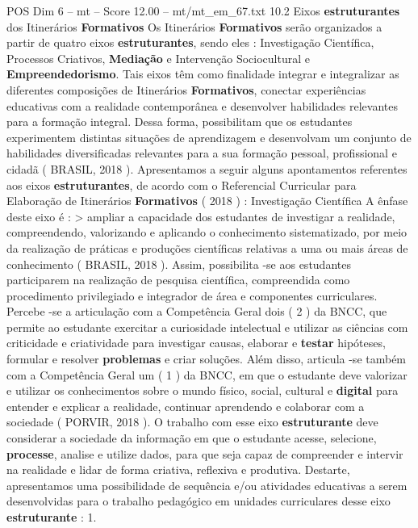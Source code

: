 \begin{textsample}{POS Dim 6 – mt – Score 12.00 – mt/mt\_em\_67.txt}  \label{ex:f6_pos_161}
10.2 Eixos \textbf{estruturantes} dos Itinerários \textbf{Formativos} Os Itinerários \textbf{Formativos} serão organizados a partir de quatro eixos \textbf{estruturantes}, sendo eles : Investigação Científica, Processos Criativos, \textbf{Mediação} e Intervenção Sociocultural e \textbf{Empreendedorismo}.
Tais eixos têm como finalidade integrar e integralizar as diferentes composições de Itinerários \textbf{Formativos}, conectar experiências educativas com a realidade contemporânea e desenvolver habilidades relevantes para a formação integral.
Dessa forma, possibilitam que os estudantes experimentem distintas situações de aprendizagem e desenvolvam um conjunto de habilidades diversificadas relevantes para a sua formação pessoal, profissional e cidadã ( BRASIL, 2018 ).
Apresentamos a seguir alguns apontamentos referentes aos eixos \textbf{estruturantes}, de acordo com o Referencial Curricular para Elaboração de Itinerários \textbf{Formativos} ( 2018 ) : Investigação Científica A ênfase deste eixo é : > ampliar a capacidade dos estudantes de investigar a realidade, compreendendo, valorizando e aplicando o conhecimento sistematizado, por meio da realização de práticas e produções científicas relativas a uma ou mais áreas de conhecimento ( BRASIL, 2018 ).
Assim, possibilita -se aos estudantes participarem na realização de pesquisa científica, compreendida como procedimento privilegiado e integrador de área e componentes curriculares.
Percebe -se a articulação com a Competência Geral dois ( 2 ) da BNCC, que permite ao estudante exercitar a curiosidade intelectual e utilizar as ciências com criticidade e criatividade para investigar causas, elaborar e \textbf{testar} hipóteses, formular e resolver \textbf{problemas} e criar soluções.
Além disso, articula -se também com a Competência Geral um ( 1 ) da BNCC, em que o estudante deve valorizar e utilizar os conhecimentos sobre o mundo físico, social, cultural e \textbf{digital} para entender e explicar a realidade, continuar aprendendo e colaborar com a sociedade ( PORVIR, 2018 ).
O trabalho com esse eixo \textbf{estruturante} deve considerar a sociedade da informação em que o estudante acesse, selecione, \textbf{processe}, analise e utilize dados, para que seja capaz de compreender e intervir na realidade e lidar de forma criativa, reflexiva e produtiva.
Destarte, apresentamos uma possibilidade de sequência e/ou atividades educativas a serem desenvolvidas para o trabalho pedagógico em unidades curriculares desse eixo \textbf{estruturante} : 1.

\end{textsample}
